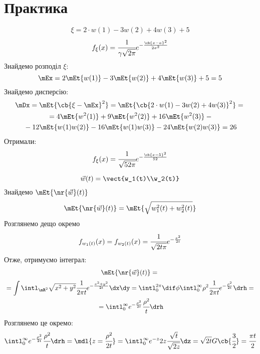 \section{Практика} 
\begin{tsk}
\begin{equation}
\xi = 2 \cdot w(1) - 3 w(2)+4w(3)+5
\end{equation}
\begin{equation}
f_\xi(x) = \cfrac{1}{\gamma \sqrt{2\pi}}e^{-\frac{\cb{x-a}^2}{2\sigma^2}}
\end{equation}
Знайдемо розподіл $\xi$:
\begin{equation}
\mEx = 2\mEt{w(1)} - 3\mEt{w(2)} +4\mEt{w(3)} + 5 = 5
\end{equation}
Знайдемо дисперсію:
\begin{multline}
\mDx = \mEt{\cb{\xi-\mEx}^2} = \mEt{\cb{2 \cdot w(1) - 3 w(2)+4w(3)}^2}  ={}\\{}= 4\mEt{w^2(1)}+9\mEt{w^2(2)} + 16\mEt{w^2(3)} -{}\\{}- 12\mEt{w(1)w(2)} - 16\mEt{w(1)w(3)} - 24\mEt{w(2)w(3)}  = 26
\end{multline}
Отримали:
\begin{equation}
f_\xi(x) = \cfrac{1}{\sqrt{52\pi}}e^{-\frac{\cb{x-5}^2}{52}}
\end{equation}
\end{tsk}
\begin{tsk}
\begin{equation}
\vec{w}(t) = \vect{w_1(t)\\w_2(t)}
\end{equation}
Знайдемо $\mEt{\nr{\vec w}(t)}$\\
\begin{equation}
\mEt{\nr{\vec w}(t)} = \mEt{\sqrt{w_1^2(t) + w_2^2(t)}}
\end{equation}
Розглянемо дещо окремо
\begin{equation}
f_{w_1(t)} (x) = f_{w_2(t)} (x) = \cfrac1{\sqrt{2t\pi}} e^{-\frac{x^2}{2t}}
\end{equation}
Отже, отримуємо інтеграл:
\begin{multline}
\mEt{\nr{\vec w}(t)} ={}\\{}= \int\intl_{\mR^2} \sqrt{x^2+y^2} \cfrac1{2\pi t} e^{-\frac{x^2+y^2}{2t}}\dx\dy = \intl_0^{2\pi} \dif\phi \intl_0^\infty \rho^2 \cfrac1{2\pi t} e^{-\frac{\rho^2}{2t}} \drh = {}\\{} = \intl_0^\infty e^{-\frac{\rho^2}{2t}} \cfrac{\rho^2}t \drh
\end{multline}
Розглянемо це окремо:
\begin{equation}
\intl_0^\infty e^{-\frac{\rho^2}{2t}} \cfrac{\rho^2}t \drh = \mdl{z = \cfrac{\rho^2}{2t}} = \intl_0^\infty e^{-z} 2z \cfrac{\sqrt t}{\sqrt{2z}} \dz = \sqrt{2t} G\cb{\cfrac32} = \cfrac{\pi t}{2}
\end{equation}
\end{tsk}
